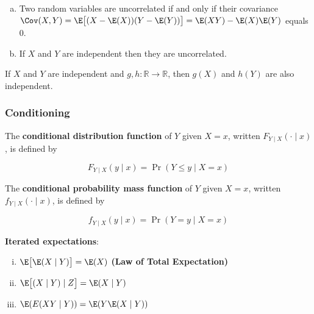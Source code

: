 \begin{proposition}
\begin{enumerate}[(a)]
\item Two random variables are uncorrelated if and only if their covariance \(\Cov(X, Y) = \E \big[(X - \E(X))(Y - \E(Y))\big] = \E(XY) - \E(X)\E(Y)\)  equals 0. 
\item If \(X\) and \(Y\) are independent then they are uncorrelated.
\end{enumerate}
\end{proposition}

\begin{theorem} If \(X\) and \(Y\) are independent and \(g, h: \mathbb{R} \to \mathbb{R}\), then \(g(X)\) and \(h(Y)\) are also independent. \end{theorem}

\subsubsection{Conditioning}

\begin{definition}The \textbf{conditional distribution function} of \(Y\) given \(X = x\), written \(F_{Y\mid X}( \cdot \mid x)\), is defined by

\[
F_{Y\mid X}( y \mid x) = \Pr(Y \leq y \mid X = x)
\]
\end{definition}

\begin{definition}The \textbf{conditional probability mass function} of \(Y\) given \(X = x\), written \(f_{Y\mid X}( \cdot \mid x)\), is defined by

\[
f_{Y\mid X}( y \mid x) = \Pr(Y = y \mid X = x)
\]
\end{definition}

\begin{theorem}\textbf{Iterated expectations}: 

\begin{enumerate}[(i)]

\item \(\E\big[ \E(X \mid Y) \big] = \E(X)\) \textbf{(Law of Total Expectation)}

\item \(\E \big[ (X \mid Y) \mid Z \big] = \E(X \mid Y)\)

\item \( \E(E(XY \mid Y)) = \E(Y \E(X \mid Y))\)

\end{enumerate}
\end{theorem}

